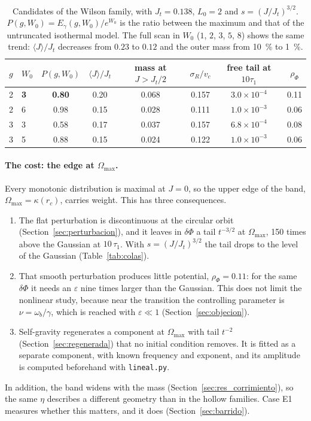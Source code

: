 \documentclass[11pt,a4paper]{article}
\begin{document}
\begin{table}[!htbp]
\centering
\small
\begin{tabular}{llcccccc}
\toprule
$g$ & $W_0$ & $P(g,W_0)$ & $\langle J\rangle/J_t$ & mass at $J>J_t/2$ &
  $\sigma_R/v_c$ & free tail at $10\tau_1$ & $\rho_\Phi$\\
\midrule
2 & \textbf{3} & \textbf{0.80} & 0.20 & 0.068 & 0.157 & $3.0\times10^{-4}$ & 0.11\\
2 & 6 & 0.98 & 0.15 & 0.028 & 0.111 & $1.0\times10^{-3}$ & 0.06\\
3 & 3 & 0.58 & 0.17 & 0.037 & 0.157 & $6.8\times10^{-4}$ & 0.08\\
3 & 5 & 0.88 & 0.15 & 0.024 & 0.122 & $1.0\times10^{-3}$ & 0.06\\
\bottomrule
\end{tabular}
\caption{Candidates of the Wilson family, with $J_t=0.138$, $L_0=2$ and $s=(J/J_t)^{3/2}$.
$P(g,W_0)=E_\gamma(g,W_0)/e^{W_0}$ is the ratio between the maximum and that of the untruncated
isothermal model. The full scan in $W_0$ ($1$, $2$, $3$, $5$, $8$) shows the same trend:
$\langle J\rangle/J_t$ decreases from $0.23$ to $0.12$ and the outer mass from \SI{10}{\%} to \SI{1}{\%}.}
\label{tab:barrido}
\end{table}

\paragraph{The cost: the edge at $\Omega_{\max}$.} Every monotonic distribution is maximal at
$J=0$, so the upper edge of the band, $\Omega_{\max}=\kappa(r_c)$, carries weight. This has three
consequences.
\begin{enumerate}
\item[(a)] The flat perturbation is discontinuous at the circular orbit
(Section~\ref{sec:perturbacion}), and it leaves in $\delta\Phi$ a tail $t^{-3/2}$ at $\Omega_{\max}$, 150
times above the Gaussian at $10\,\tau_1$. With $s=(J/J_t)^{3/2}$ the tail drops to the level
of the Gaussian (Table~\ref{tab:colas}).
\item[(b)] That smooth perturbation produces little potential, $\rho_\Phi=0.11$: for the same
$\delta\Phi$ it needs an $\varepsilon$ nine times larger than the Gaussian. This does not limit the
nonlinear study, because near the transition the controlling parameter is
$\nu=\omega_b/\gamma$, which is reached with $\varepsilon\ll1$ (Section~\ref{sec:objecion}).
\item[(c)] Self-gravity regenerates a component at $\Omega_{\max}$ with tail $t^{-2}$
(Section~\ref{sec:regenerada}) that no initial condition removes. It is fitted as a
separate component, with known frequency and exponent, and its amplitude is computed
beforehand with \texttt{lineal.py}.
\end{enumerate}
In addition, the band widens with the mass (Section~\ref{sec:res_corrimiento}), so the same
$\eta$ describes a different geometry than in the hollow families. Case E1 measures whether
this matters, and it does (Section~\ref{sec:barrido}).
\end{document}
